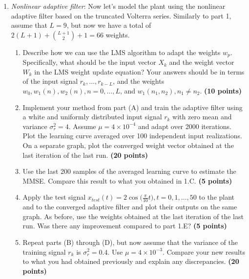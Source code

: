 \documentclass[10pt]{article}
\begin{document}
\begin{enumerate}
	\item\textit{Nonlinear adaptive filter}: Now let's model the plant using the nonlinear adaptive filter based on the truncated Volterra series. Similarly to part 1, assume that $L = 9$, but now we have a total of $2(L+1) + \binom{L+1}{2} + 1 = 66$ weights.
	
	\begin{enumerate}[label=\textbf{(\Alph*)}]
		\item Describe how we can use the LMS algorithm to adapt the weights $w_p$. Specifically, what should be the input vector $X_k$ and the weight vector $W_k$ in the LMS weight update equation? Your answers should be in terms of the input signal $r_k, \ldots, r_{k-L}$, and the weights $w_0, w_1(n), w_2(n), n = 0, \ldots, L$, and $w_1(n_1, n_2), n_1\neq n_2$. \textbf{(10 points)} 
		\item Implement your method from part (A) and train the adaptive filter using a white and uniformly distributed input signal $r_k$ with zero mean and variance $\sigma_r^2 = 4$. Assume $\mu = 4\times 10^{-4}$ and adapt over 2000 iterations. Plot the learning curve averaged over 100 independent input realizations. On a separate graph, plot the converged weight vector obtained at the last iteration of the last  run. \textbf{(20 points)} 
		\item Use the last 200 samples of the averaged learning curve to estimate the MMSE. Compare this result to what you obtained in 1.C. \textbf{(5 points)} 
		\item Apply the test signal $x_{test}(t) = 2\cos\big(\frac{\pi}{10} t\big), t = 0, 1,\ldots, 50$ to the plant and to the converged adaptive filter and plot their outputs on the same graph. As before, use the weights obtained at the last iteration of the last run. Was there any improvement compared to part 1.E? \textbf{(5 points)}
		\item Repeat parts (B) through (D), but now assume that the variance of the training signal $r_k$ is $\sigma_r^2 = 0.4$. Use $\mu = 4\times10^{-3}$. Compare your new results to what you had obtained previously and explain any discrepancies. \textbf{(20 points)}
	\end{enumerate}
	
\end{enumerate}
\end{document}
